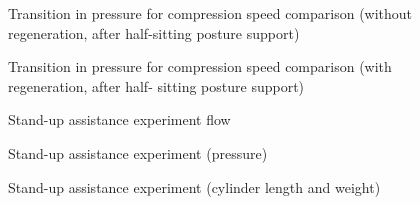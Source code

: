 \begin{figure}[t]%
        \begin{center}%
         \caption{Transition in pressure for compression speed comparison (without regeneration, after
         half-sitting posture support)}%
         \vspace{-7mm}
        \end{center}%
\end{figure}%
\begin{figure}[t]%
        \begin{center}%
         \caption{Transition in pressure for compression speed comparison (with regeneration, after half-
         sitting posture support)}%
         \vspace{-9mm}
        \end{center}%
\end{figure}%
\begin{figure}[t]%
        \begin{center}%
         \caption{Stand-up assistance experiment flow}%
         \vspace{-8mm}
        \end{center}%
\end{figure}%
\begin{figure}[t]%
        \begin{center}%
         \caption{Stand-up assistance experiment (pressure)}%
         \vspace{-8mm}
        \end{center}%
\end{figure}%
\begin{figure}[t]%
        \begin{center}%
         \caption{Stand-up assistance experiment (cylinder length and weight)}%
         \vspace{-8mm}
        \end{center}%
\end{figure}%
